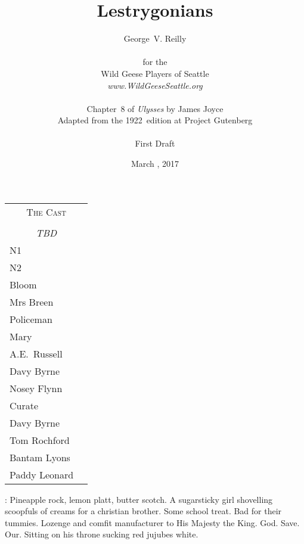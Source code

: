 


\title{\Huge Lestrygonians}
\author{George~V. Reilly\\
\\
{\small for the}\\
Wild Geese Players of Seattle\\
{\emph{www.WildGeeseSeattle.org}}\\
\\
{\small Chapter~8 of \emph{Ulysses} by James Joyce}\\
{\small Adapted from the 1922~edition at Project Gutenberg}
\\
\\
{\small First Draft}}
\date{March , 2017}
\raggedbottom



\maketitle
\thispagestyle{empty}
\pagebreak

\begin{tabular}{lp{10cm}}
    \multicolumn{2}{c}{\Large \textsc{The Cast}} \\
\\
    \multicolumn{2}{c}{\large \textit{TBD}} \\
N1 \\
N2 \\
Bloom \\
Mrs Breen \\
Policeman \\
Mary \\
A.E.~Russell \\
Davy Byrne \\
Nosey Flynn \\
Curate \\
Davy Byrne \\
Tom Rochford \\
Bantam Lyons \\
Paddy Leonard \\
\end{tabular}

\thispagestyle{empty}
\newpage


\setcounter{page}{1}

\BloomInt:
Pineapple rock, lemon platt, butter scotch.
A sugarsticky girl shovelling scoopfuls of creams for a christian brother.
Some school treat.
Bad for their tummies.
Lozenge and comfit manufacturer to His Majesty the King.
God.
Save.
Our.
Sitting on his throne sucking red jujubes white.

